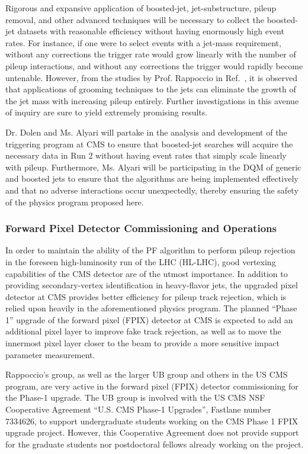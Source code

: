 \documentclass[12pt]{proposalnsf}
\begin{document}
Rigorous and
expansive application of boosted-jet, jet-substructure, pileup
removal, and other advanced techniques
will be necessary to collect the boosted-jet datasets with reasonable
efficiency without having enormously high event rates. For instance,
if one were to select events with a jet-mass requirement, without any
corrections the trigger rate would grow linearly with the number of
pileup interactions, and without any corrections the trigger would
rapidly become untenable. However, from the studies by Prof. Rappoccio in
Ref.~\cite{SMP-12-019}, it is observed that applications of grooming
techniques to the jets can eliminate the growth of the jet mass with
increasing pileup entirely. Further investigations in this avenue of
inquiry are sure to yield extremely promising results. 


Dr. Dolen and Ms. Alyari will partake in the analysis and development
of the triggering program at CMS to ensure that boosted-jet searches
will acquire the necessary data in Run 2 without having event rates
that simply scale linearly with pileup. 
Furthermore, Ms. Alyari will be participating in the DQM of generic
and boosted jets to ensure that the algorithms are being implemented
effectively and that no adverse interactions occur unexpectedly,
thereby ensuring the safety of the physics program proposed here. 



\subsubsection{Forward Pixel Detector Commissioning and Operations} 
\label{sec:fpix}

In order to maintain the ability of the PF algorithm to perform pileup
rejection in the foreseen high-luminosity run of the LHC (HL-LHC),
good vertexing capabilities of the CMS detector are of the
utmost importance. In addition to providing secondary-vertex
identification in heavy-flavor jets, the upgraded pixel detector at
CMS provides better efficiency for pileup track rejection, which is
relied upon heavily in the aforementioned physics program. The planned
``Phase 1'' upgrade of the forward pixel (FPIX) detector at CMS is
expected to add an additional pixel layer to improve fake track
rejection, as well as to move the innermost pixel layer closer to the
beam to provide a more sensitive impact parameter measurement. 

Rappoccio's group, as well as the larger UB group and others in the US
CMS program, are very active in
the forward pixel (FPIX) detector
commissioning for the Phase-1 upgrade. The UB group is involved with
the US CMS NSF Cooperative Agreement ``U.S. CMS Phase-1 Upgrades'',
Fastlane number 7334626, to support undergraduate students working on
the CMS Phase 1 FPIX upgrade project. 
However, this Cooperative Agreement does not provide support
for the graduate students nor postdoctoral fellows already working on
the project. 
\end{document}
